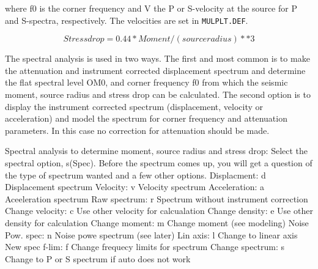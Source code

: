where f0 is the corner frequency and V the P or S-velocity at the source for P and S-spectra, respectively. The velocities are set in \texttt{MULPLT.DEF}. 

\begin{displaymath}
Stress drop = 0.44 * Moment /(source radius)**3
\end{displaymath}

 The spectral analysis is used in two ways. The first and most common is to make the attenuation and instrument corrected displacement spectrum and determine the flat spectral level OM0, and corner frequency f0 from which the seismic moment, source radius and stress drop can be calculated. The second option is to display the instrument corrected spectrum (displacement, velocity or acceleration) and model the spectrum for corner frequency and attenuation parameters. In this case no correction for attenuation should be made. 

Spectral analysis to determine moment, source radius and stress drop: 
\newline 
Select the spectral option, s(Spec). Before the spectrum comes up, you will get a question of the type of spectrum wanted and a few other options.
\newline 
\newline Displacment:         d   Displacement spectrum
\newline Velocity:            v   Velocity spectrum
\newline Acceleration:        a   Aceeleration spectrum
\newline Raw spectrum:        r   Spectrum without instrument correction
\newline Change velocity:     c   Use other velocity for calcualation
\newline Change density:      e   Use other density for calculation
\newline Change moment:       m   Change moment (see modeling)
\newline Noise Pow. spec:     n   Noise powe spectrum (see later)
\newline Lin axis:            l   Change to linear axis
New spec f-lim:      f   Change frequecy limits for spectrum
Change spectrum:     s   Change to P or S spectrum if auto does not work


